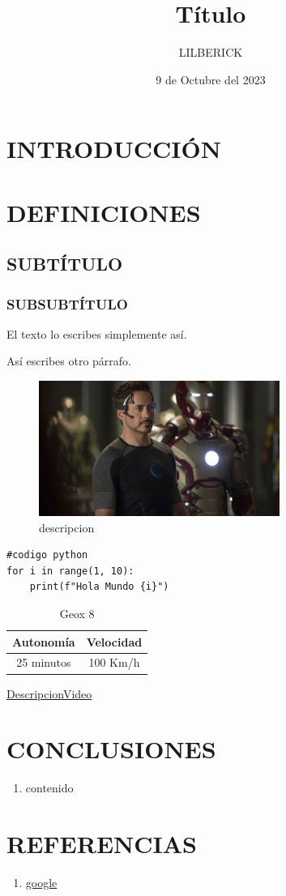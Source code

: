 \documentclass[12pt,a4paper]{article}
\title{Título}
\author{LILBERICK}
\date{9 de Octubre del 2023}
\begin{document}
\maketitle
\section{INTRODUCCIÓN}
\section{DEFINICIONES}
\subsection{SUBTÍTULO}
\subsubsection{SUBSUBTÍTULO}
El texto lo escribes simplemente así.

Así escribes otro párrafo.

\begin{figure}[h]
	\centering
	\includegraphics[width=0.7\textwidth]{img/1.png}
	\caption{descripcion}
\end{figure}

\begin{lstlisting}[style=PythonStyle]
#codigo python
for i in range(1, 10):
	print(f"Hola Mundo {i}")
\end{lstlisting}

\begin{table}[htbp]
	\begin{center}
		\caption{Geox 8}
		\begin{tabular}{|c|c|}
			\hline
			\textbf{Autonomía} & \textbf{Velocidad}\\
			\hline
			25 minutos & 100 Km/h\\
			\hline
		\end{tabular}
	\end{center}
\end{table}

\begin{center}
	\href{https://www.youtube.com/watch?v=Px4GHgnrj1A}{DescripcionVideo}
\end{center}

\pagebreak
\section*{CONCLUSIONES}
\begin{enumerate}
	\item contenido
\end{enumerate}
\pagebreak
\section*{REFERENCIAS}
\begin{enumerate}
	\item \href{www.google.com}{google}
\end{enumerate}
\end{document}
